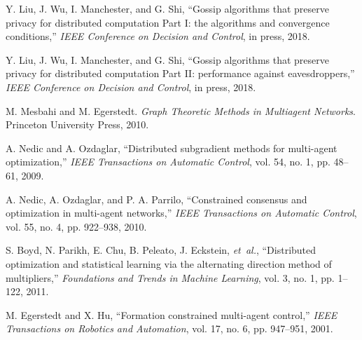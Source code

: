 \documentclass[a4paper, 11pt]{article}
\newcommand{\1}{\mathbf{1}}
\begin{document}

%
%
%
\begin{thebibliography}{1}

Y. Liu, J. Wu, I. Manchester, and G. Shi, ``Gossip algorithms that preserve privacy for distributed computation
{P}art {I}: the algorithms and convergence conditions,'' {\em IEEE Conference on Decision and Control}, in press, 2018.

Y. Liu, J. Wu, I. Manchester, and G. Shi, ``Gossip algorithms that preserve privacy for distributed computation
{P}art {II}: performance against eavesdroppers,'' {\em IEEE Conference on Decision and Control}, in press, 2018.


M. Mesbahi and M. Egerstedt. \emph{{G}raph {T}heoretic {M}ethods in {M}ultiagent {N}etworks}.
\newblock Princeton University Press,
2010.

A. Nedic and A. Ozdaglar, ``Distributed subgradient methods for multi-agent
optimization,'' \emph{IEEE Transactions on Automatic Control}, vol. 54,
no. 1, pp. 48--61, 2009.

A. Nedic, A. Ozdaglar, and P. A. Parrilo, ``Constrained consensus and
optimization in multi-agent networks,'' \emph{IEEE Transactions on Automatic
	Control}, vol. 55, no. 4, pp. 922--938, 2010.

S. Boyd, N. Parikh, E. Chu, B. Peleato, J. Eckstein, {\em et~al.},
``Distributed optimization and statistical learning via the alternating
direction method of multipliers,'' {\em Foundations and
	Trends in Machine Learning}, vol. 3, no. 1, pp. 1--122,
2011.


M. Egerstedt and X. Hu,
``Formation constrained multi-agent control,''
{\em IEEE Transactions on Robotics and Automation}, vol. 17, no. 6, pp. 947--951,
2001.






\end{thebibliography}
\end{document}
